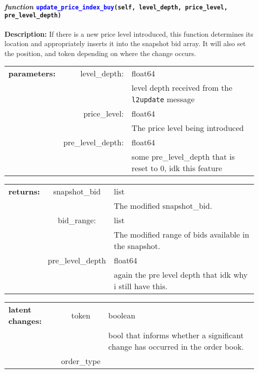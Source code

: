 \paragraph{\textit{function} \textcolor{blue}{\texttt{update\_price\_index\_buy}}\texttt{(self, level\_depth, price\_level, pre\_level\_depth)}}\hfill\break
\noindent \textbf{Description:} If there is a new price level introduced, this function determines its location and appropriately inserts it into the snapshot bid array. It will also set the position, and token depending on where the change occurs. 

\begin{tabular}{r r l }
	\textbf{parameters:}	& level\_depth: & float64\\
	&  & level depth received from the \texttt{l2update} message\\
	& price\_level:& float64\\
	&& The price level being introduced\\
	& pre\_level\_depth:& float64\\
	&& some pre\_level\_depth that is reset to 0, idk this feature
\end{tabular}

\begin{tabular}{l c l}
	\textbf{returns:} & snapshot\_bid & list\\
	& & The modified snapshot\_bid.\\
	& bid\_range: & list \\
	&& The modified range of bids available in the snapshot.\\
	&pre\_level\_depth &float64\\
	&& again the pre level depth that idk why i still have this.\\
\end{tabular}

\begin{tabular}{l c l}
	\textbf{latent changes:} & token & boolean\\
	& & bool that informs whether a significant change has occurred in the order book. \\
	&order\_type&\\
\end{tabular}


